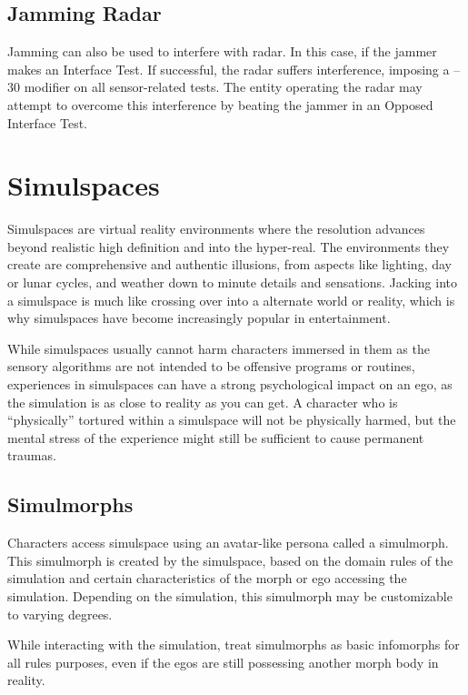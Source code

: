 \subsection{Jamming Radar}

Jamming can also be used to interfere with radar. In 
this case, if the jammer makes an Interface Test. If 
successful, the radar suffers interference, imposing 
a –30 modifier on all sensor-related tests. The entity 
operating the radar may attempt to overcome this 
interference by beating the jammer in an Opposed 
Interface Test.

\section{Simulspaces}

Simulspaces are virtual reality environments where 
the resolution advances beyond realistic high definition
and into the hyper-real. The environments they
create are comprehensive and authentic illusions, from 
aspects like lighting, day or lunar cycles, and weather 
down to minute details and sensations. Jacking into 
a simulspace is much like crossing over into a alternate
world or reality, which is why simulspaces have
become increasingly popular in entertainment.

While simulspaces usually cannot harm characters 
immersed in them as the sensory algorithms are not 
intended to be offensive programs or routines, experiences
in simulspaces can have a strong psychological
impact on an ego, as the simulation is as close to 
reality as you can get. A character who is ``physically'' 
tortured within a simulspace will not be physically 
harmed, but the mental stress of the experience might 
still be sufficient to cause permanent traumas.

\subsection{Simulmorphs}

Characters access simulspace using an avatar-like persona
called a simulmorph. This simulmorph is created by
the simulspace, based on the domain rules of the simulation
and certain characteristics of the morph or ego
accessing the simulation. Depending on the simulation, 
this simulmorph may be customizable to varying degrees.

While interacting with the simulation, treat simulmorphs
as basic infomorphs for all rules purposes,
even if the egos are still possessing another morph 
body in reality.

